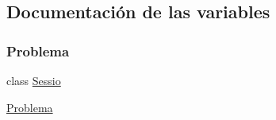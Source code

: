 \subsection{Documentación de las variables}
\mbox{\label{_sessio_8hh_a2fec61464f4d0b831e76553fca0c62bf}} 
\subsubsection{\texorpdfstring{Problema}{Problema}}
{\footnotesize\ttfamily class \mbox{\hyperlink{class_sessio}{Sessio}}

     \mbox{\hyperlink{class_problema}{Problema}}}

